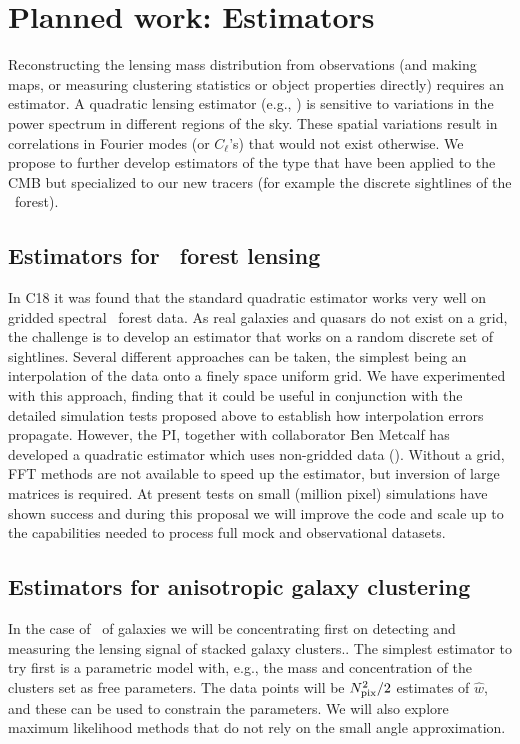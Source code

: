 \section{Planned work: Estimators}

Reconstructing the lensing mass distribution from observations
(and making maps, or measuring
clustering statistics or object properties directly) requires  an
estimator. 
A quadratic lensing estimator (e.g., \cite{okamoto}) 
is sensitive to variations in the power spectrum in  different 
regions of the sky.  These spatial variations result in
correlations in Fourier modes (or $C_\ell$'s) that would not
exist otherwise. 
We propose to further develop estimators
of the type that have been applied to the CMB but specialized to our
new tracers (for example the discrete sightlines of the \lya\ forest).


\subsection{Estimators for \lya\ forest lensing}
In C18 it was found that the standard quadratic estimator works 
very well on gridded spectral \lya\ forest data. As real
galaxies and quasars do not exist on a grid, the challenge is
to develop an estimator that works on a random discrete set of sightlines.
Several different approaches can be taken, the simplest being an interpolation
of the data onto a finely space uniform grid. We have experimented with this
approach, finding that it could be useful in conjunction with the detailed
simulation tests proposed above to establish how interpolation errors 
propagate. However, the PI, together with collaborator Ben Metcalf has 
developed a quadratic estimator which uses non-gridded data 
(\cite{metcalf17}). Without a grid, FFT methods are not available to 
speed up the estimator, but inversion of large matrices is required. At 
present tests on small (million pixel) simulations have shown success and
during this proposal we will improve the code and scale up to the capabilities
needed to process full mock and observational datasets.


\subsection{Estimators for anisotropic galaxy clustering}

In the case of \atf\ of galaxies
 we will be concentrating first on detecting and
measuring the lensing signal of stacked galaxy clusters..
The simplest estimator to try first is a parametric model with,
e.g., the mass and concentration of the clusters set as free
parameters. The data points will be   $N_{\rm pix}^2/2$
estimates of $\hat w$, and these
can be used to constrain the parameters.
We will also explore maximum likelihood methods
that do not rely on the small angle approximation.


